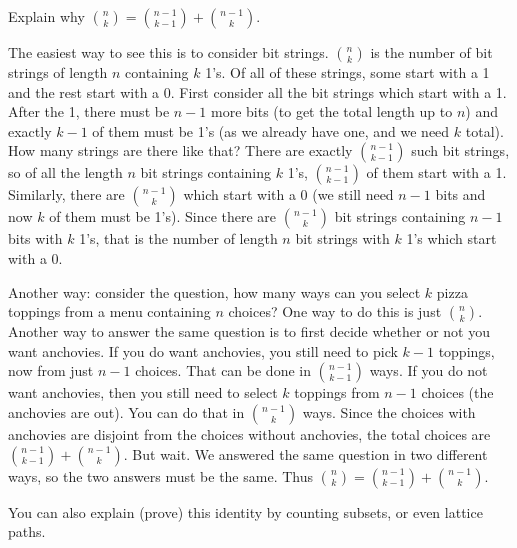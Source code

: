 \documentclass[12pt]{article}
\begin{document}
\begin{example}
  Explain why ${n \choose k} = {n-1 \choose k-1} + {n-1 \choose k}$.
  \begin{solution}
    The easiest way to see this is to consider bit strings.  ${n \choose k}$ is the number of bit strings of length $n$ containing $k$ 1's.  Of all of these strings, some start with a 1 and the rest start with a 0.  First consider all the bit strings which start with a 1.  After the 1, there must be $n-1$ more bits (to get the total length up to $n$) and exactly $k-1$ of them must be 1's (as we already have one, and we need $k$ total).  How many strings are there like that?  There are exactly ${n-1 \choose k-1}$ such bit strings, so of all the length $n$ bit strings containing $k$ 1's, ${n-1 \choose k-1}$ of them start with a 1.  Similarly, there are ${n-1\choose k}$ which start with a 0 (we still need $n-1$ bits and now $k$ of them must be 1's).  Since there are ${n-1 \choose k}$ bit strings containing $n-1$ bits with $k$ 1's, that is the number of length $n$ bit strings with $k$ 1's which start with a 0.

    Another way: consider the question, how many ways can you select $k$ pizza toppings from a menu containing $n$ choices?  One way to do this is just ${n \choose k}$.  Another way to answer the same question is to first decide whether or not you want anchovies.  If you do want anchovies, you still need to pick $k-1$ toppings, now from just $n-1$ choices.  That can be done in ${n-1 \choose k-1}$ ways.  If you do not want anchovies, then you still need to select $k$ toppings from $n-1$ choices (the anchovies are out).  You can do that in ${n-1 \choose k}$ ways.  Since the choices with anchovies are disjoint from the choices without anchovies, the total choices are ${n-1 \choose k-1}+{n-1 \choose k}$.  But wait.  We answered the same question in two different ways, so the two answers must be the same.  Thus ${n \choose k} = {n-1\choose k-1} + {n-1 \choose k}$.

    You can also explain (prove) this identity by counting subsets, or even lattice paths.
  \end{solution}

\end{example}
\end{document}
